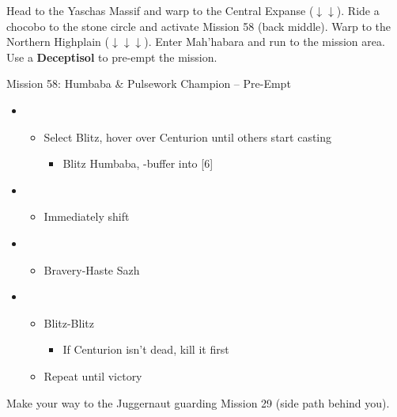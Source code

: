 Head to the Yaschas Massif and warp to the Central Expanse ($\downarrow\downarrow$).
Ride a chocobo to the stone circle and activate Mission 58 (back middle).
Warp to the Northern Highplain ($\downarrow\downarrow\downarrow$).
Enter Mah'habara and run to the mission area.
Use a \textbf{Deceptisol} to pre-empt the mission.

\begin{battle}{Mission 58: Humbaba \& Pulsework Champion -- Pre-Empt}
	\begin{itemize}
		\item \third
			\begin{itemize}
				\item Select Blitz, hover over Centurion until others start casting
					\begin{itemize}
						\item Blitz Humbaba, \rav-buffer into [6]
					\end{itemize}
			\end{itemize}
		\item \sixth
			\begin{itemize}
				\item Immediately shift
			\end{itemize}
		\item \fourth
			\begin{itemize}
				\item Bravery-Haste Sazh
			\end{itemize}
		\item \second
			\begin{itemize}
				\item Blitz-Blitz
					\begin{itemize}
						\item If Centurion isn't dead, kill it first
					\end{itemize}
				\item Repeat until victory
			\end{itemize}
	\end{itemize}
\end{battle}

Make your way to the Juggernaut guarding Mission 29 (side path behind you).

